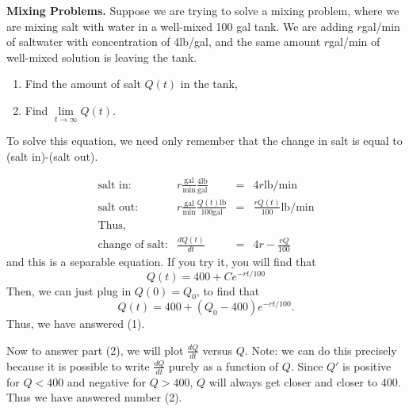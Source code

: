 \documentclass[a5paper]{article}
\theoremstyle{definition}%
\numberwithin{exercise}{section}
\theoremstyle{remark}%
\begin{document}
\textbf{Mixing Problems.} Suppose we are trying to solve a mixing problem, where we are mixing salt with water in a well-mixed 100 gal tank. We are adding $r$gal/min of saltwater with concentration of 4lb/gal, and the same amount $r$gal/min of well-mixed solution is leaving the tank. 
\begin{enumerate}
\item Find the amount of salt $Q(t)$ in the tank,
\item Find $\lim\limits_{t\to\infty} Q(t)$. 
\end{enumerate}
\begin{highlight}
To solve this equation, we need only remember that the change in salt is equal to (salt in)-(salt out).
\end{highlight}
\[\begin{array}{rrcl}
\text{salt in:}& r\frac{\text{gal}}{\text{min}}\frac{4\text{lb}}{\text{gal}}&=&4r\text{lb}/\text{min}\\
\text{salt out:}& r\frac{\text{gal}}{\text{min}}\frac{Q(t)\text{lb}}{100\text{gal}}&=&\frac{rQ(t)}{100}\text{lb}/\text{min}\\
\text{Thus, }\\
\text{change of salt:}& \frac{dQ(t)}{dt} &=& 4r-\frac{rQ}{100}
\end{array}\]
and this is a separable equation. If you try it, you will find that 
$$Q(t) = 400+Ce^{-rt/100}$$
Then, we can just plug in $Q(0)=Q_0$, to find that 
$$Q(t) = 400+(Q_0-400)e^{-rt/100}.$$
Thus, we have answered (1).

Now to answer part (2), we will plot $\frac{dQ}{dt}$ versus $Q$. 
Note: we can do this precisely because it is possible to write $\frac{dQ}{dt}$ purely as a function of $Q$. Since $Q'$ is positive for $Q<400$ and negative for $Q>400$, $Q$ will always get closer and closer to 400. Thus we have answered number (2).
\end{document}
